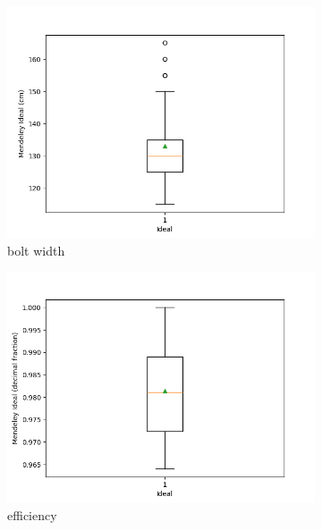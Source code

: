 \begin{figure}[H]
    \centering
    \begin{subfigure}[b]{0.45\textwidth}
        \centering
        \includegraphics[width=\textwidth]{Images/Mendeley_bolt_width_ideal_Boxplot.png}
        \caption{bolt width}
        \label{fig:body_scan_bolt_width}
    \end{subfigure}
    \hfill
    \begin{subfigure}[b]{0.45\textwidth}
        \centering
        \includegraphics[width=\textwidth]{Images/Mendeley_efficiency_ideal_Boxplot.png}
        \caption{efficiency}
        \label{fig:body_scan_efficiency}
    \end{subfigure}
    \vfill
    \begin{subfigure}[b]{0.45\textwidth}

\end{subfigure}
\end{figure}

